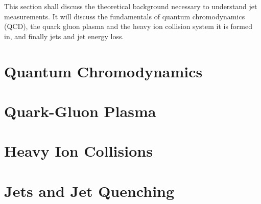 This section shall discuss the theoretical background necessary to understand jet measurements.
It will discuss the fundamentals of quantum chromodynamics (QCD), the quark gluon plasma and the heavy ion collision system it is formed in, and finally jets and jet energy loss.

\section{Quantum Chromodynamics}
\label{sec:qcd}


\section{Quark-Gluon Plasma}
\label{sec:qgp}


\section{Heavy Ion Collisions}
\label{sec:HICollisions}


\section{Jets and Jet Quenching}
\label{sec:jets}

